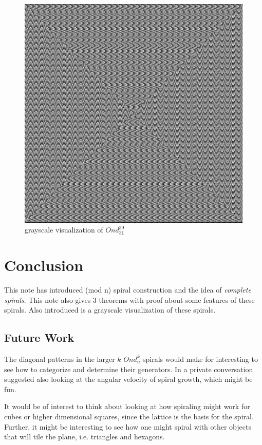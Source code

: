 \documentclass[11pt]{amsart}
\theoremstyle{mydef}
\begin{document}
\begin{figure}
\centering
\includegraphics[scale=.4]{N31k39.png}
\caption{grayscale visualization of $Ond^{39}_{31}$}
\label{fig:viz3139}
\end{figure}

\section{Conclusion}
This note has introduced (mod n) spiral construction and the idea of \textit{complete spirals}. This note also gives 3 theorems with proof about some features of these spirals. Also introduced is a grayscale visualization of these spirals. 

\subsection{Future Work}
The diagonal patterns in the larger $k$ $Ond^k_n$ spirals would make for interesting to see how to categorize and determine their generators. In a private conversation \cite{Kusner} suggested also looking at the angular velocity of spiral growth, which might be fun.

It would be of interest to think about looking at how spiraling might work for cubes or higher dimensional squares, since the lattice is the basis for the spiral. Further, it might be interesting to see how one might spiral with other objects that will tile the plane, i.e. triangles and hexagons.
\end{document}
